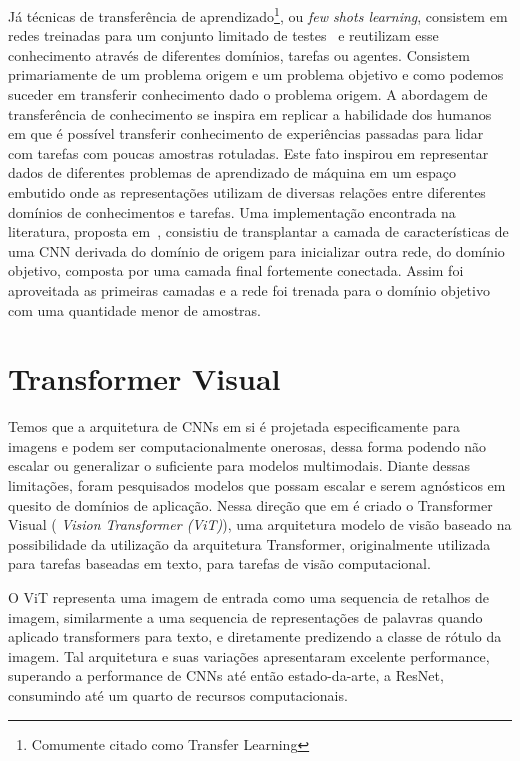 Já técnicas de transferência de aprendizado\footnote{Comumente citado como Transfer Learning}, ou \textit{few shots learning}, consistem em redes treinadas para um conjunto limitado de testes~\cite{rostami2019learning}
e reutilizam esse conhecimento através de diferentes domínios, tarefas ou agentes. Consistem primariamente de um problema origem e um problema objetivo e como podemos suceder em transferir conhecimento dado o problema origem. A abordagem de transferência de conhecimento se inspira em replicar a habilidade dos humanos em que é possível transferir conhecimento de experiências passadas para lidar com tarefas com poucas amostras rotuladas. Este fato inspirou em representar dados de diferentes problemas de aprendizado de máquina em um espaço embutido onde as representações utilizam de diversas relações entre diferentes domínios de conhecimentos e tarefas. Uma implementação encontrada na literatura, proposta em~\cite{DBLP:journals/corr/abs-1811-04863}, consistiu de transplantar a camada de características de uma CNN derivada do domínio de origem para inicializar outra rede, do domínio objetivo, composta por uma camada final fortemente conectada. Assim foi aproveitada as primeiras camadas e a rede foi trenada para o domínio objetivo com uma quantidade menor de amostras.


\section{Transformer Visual}\label{sec:Cap2_transformer_visual}


Temos que a arquitetura de CNNs em si é projetada especificamente para imagens e podem ser computacionalmente onerosas, dessa forma podendo não escalar ou generalizar o suficiente para modelos multimodais. Diante dessas limitações, foram pesquisados modelos que possam escalar e serem agnósticos em quesito de domínios de aplicação. Nessa direção que em \cite{dosovitskiy2020image} é criado o Transformer Visual ( \textit{Vision Transformer (ViT)}), uma arquitetura modelo de visão baseado na possibilidade da utilização da arquitetura Transformer, originalmente utilizada para tarefas baseadas em texto, para tarefas de visão computacional.

O ViT representa uma imagem de entrada como uma sequencia de retalhos de imagem, similarmente a uma sequencia de representações de palavras quando aplicado transformers para texto, e diretamente predizendo a classe de rótulo da imagem. Tal arquitetura e suas variações apresentaram excelente performance, superando a performance de CNNs até então estado-da-arte, a ResNet, consumindo até um quarto de recursos computacionais.


